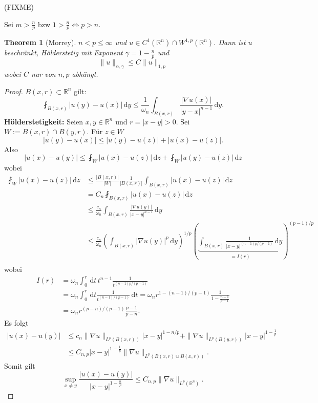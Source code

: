 \documentclass[
paper=a4,
bibtotocnumbered,
liststotocnumbered,
tablecaptionabove,
pointlessnumbers,
twoside,
openright,
10pt
]
{report}
\newtheorem{thm}{Theorem}[chapter]
\theoremstyle{definition}
\numberwithin{equation}{chapter}
\begin{document}
(FIXME)

Sei $m>\frac{n}{p}$ bzw $1 > \frac{n}{p}\iff p>n$.
\begin{thm}[Morrey]\label{3.4}
	$n<p\le \infty$ und $u\in C^1(\mathbb R^n)\cap W^{1,p}(\mathbb R^n)$. Dann ist $u$ beschränkt, Hölderstetig mit Exponent $\gamma =1 - \frac{n}{p}$ und
	\begin{equation}
		\| u\|_{\alpha, \gamma} \le C \| u \|_{1,p}
	\end{equation}
	wobei $C$ nur von $n,p$ abhängt.
\end{thm}
\begin{proof}
	$B(x,r) \subset \mathbb R^n$ gilt:
	\begin{equation}
		\fint_{B(x,r)} | u(y)- u(x) |\, \mathrm dy \le \frac{1}{\omega_n} \int_{B(x,r)} \frac{|\nabla u(x)|}{|y-x|^{n-1}}\, \mathrm dy.
	\end{equation}
	\textbf{Hölderstetigkeit:} Seien $x,y\in \mathbb R^n$ und $r=|x-y|>0$. Sei $W:= B(x,r) \cap B(y,r)$. Für $z\in W$
	\begin{equation}
	|u(y)-u(x)|\le |u(y)-u(z)|+ |u(x)-u(z)|.
	\end{equation}
	Also
	\begin{equation}
		|u(x)-u(y)| \le \fint_W | u(x) - u(z)| \, \mathrm dz + \fint_W |u(y)-u(z)|\, \mathrm dz
	\end{equation}
	wobei 
	\begin{align*}
	\fint_W |u(x)-u(z)|\, \mathrm dz &\le \frac{|B(x,r)|}{|W|} \frac{1}{|B(x,r)|} \int_{B(x,r)} |u(x)- u(z)|\, \mathrm dz\\
	&= C_n \fint_{B(x,r)} |u(x)-u(z)|\, \mathrm dz \\
	&\le \frac{c_n}{\omega_n} \int_{B(x,r)} \frac{|\nabla u(y)|}{|x-y|^{n-1}} \, \mathrm dy \\
	&\le \frac{c_n}{\omega_n} \left ( \int_{B(x,r)} |\nabla u(y)|^p \, \mathrm dy \right )^{1/p} \left ( \underbrace{\int_{B(x,r)} \frac{1}{|x-y|^{(n-1) p/(p-1)}}\, \mathrm dy}_{=I(r)} \right )^{(p-1)/p}\\
\end{align*}
wobei
\begin{align*}
	I(r) &= \omega_n \int_0^r \, \mathrm dt \, t^{n-1} \frac{1}{t^{(n-1) p/(p-1)}} \\
	&= \omega_n \int_0^r \, \mathrm dt \frac{1}{t^{(n-1)/(p-1)}}\, \mathrm dt = \omega_n r^{1-(n-1)/(p-1)} \frac{1}{1-\frac{n-1}{p-1}} \\
	&= \omega_n r^{(p-n)/(p-1)}\frac{p-1}{p-n}.
\end{align*}
Es folgt
\begin{align*}
	|u(x)-u(y)| &\le c_n \| \nabla u\|_{L^p(B(x,r))} |x-y|^{1-n/p} +\| \nabla u\|_{L^p(B(y,r))} |x-y|^{1-\frac{1}{p}}\\
&\le C_{n,p} |x-y|^{1-\frac{1}{p}}\|\nabla u \|_{L^p(B(x,r)\cup B(x,r))}.
\end{align*}
Somit gilt
\begin{equation}
	\sup_{x\ne y} \frac{|u(x)-u(y)|}{{|x-y|}^{1-\frac{n}{p}}} \le C_{n,p} \| \nabla u\|_{L^p(\mathbb R^n)}.
\end{equation}

\end{proof}
\end{document}
